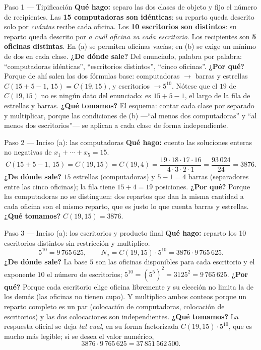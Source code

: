 \documentclass[11pt]{article}
\begin{document}
\begin{paso}{Paso 1 --- Tipificación}
\textbf{Qué hago:} separo las dos clases de objeto y fijo el número de recipientes.
Las \textbf{15 computadoras son idénticas}: su reparto queda descrito solo por \emph{cuántas} recibe cada oficina. Los \textbf{10 escritorios son distintos}: su reparto queda descrito por \emph{a cuál oficina va cada escritorio}. Los recipientes son \textbf{5 oficinas distintas}. En (a) se permiten oficinas vacías; en (b) se exige un mínimo de dos en cada clase.
\textbf{¿De dónde sale?} Del enunciado, palabra por palabra: ``computadoras idénticas'', ``escritorios distintos'', ``cinco oficinas''.
\textbf{¿Por qué?} Porque de ahí salen las dos fórmulas base: computadoras $\to$ barras y estrellas $C(15+5-1,\,15)=C(19,15)$, y escritorios $\to 5^{10}$. Nótese que el $19$ de $C(19,15)$ no es ningún dato del enunciado: es $15+5-1$, el largo de la fila de estrellas y barras.
\textbf{¿Qué tomamos?} El esquema: contar cada clase por separado y multiplicar, porque las condiciones de (b) —``al menos dos computadoras'' y ``al menos dos escritorios''— se aplican a cada clase de forma independiente.
\end{paso}

\begin{paso}{Paso 2 --- Inciso (a): las computadoras}
\textbf{Qué hago:} cuento las soluciones enteras no negativas de $x_1+\cdots+x_5=15$.
\[
C(15+5-1,\,15)=C(19,15)=C(19,4)=\frac{19\cdot18\cdot17\cdot16}{4\cdot3\cdot2\cdot1}=\frac{93\,024}{24}=3876 .
\]
\textbf{¿De dónde sale?} $15$ estrellas (computadoras) y $5-1=4$ barras (separadores entre las cinco oficinas); la fila tiene $15+4=19$ posiciones.
\textbf{¿Por qué?} Porque las computadoras no se distinguen: dos repartos que dan la misma cantidad a cada oficina son el mismo reparto, que es justo lo que cuenta barras y estrellas.
\textbf{¿Qué tomamos?} $C(19,15)=3876$.
\end{paso}

\begin{paso}{Paso 3 --- Inciso (a): los escritorios y producto final}
\textbf{Qué hago:} reparto los 10 escritorios distintos sin restricción y multiplico.
\[
5^{10}=9\,765\,625,\qquad N_a=C(19,15)\cdot 5^{10}=3876\cdot 9\,765\,625 .
\]
\textbf{¿De dónde sale?} La base $5$ son las oficinas disponibles para cada escritorio y el exponente $10$ el número de escritorios; $5^{10}=(5^5)^2=3125^2=9\,765\,625$.
\textbf{¿Por qué?} Porque cada escritorio elige oficina libremente y su elección no limita la de los demás (las oficinas no tienen cupo). Y multiplico ambos conteos porque un reparto completo es un par (colocación de computadoras, colocación de escritorios) y las dos colocaciones son independientes.
\textbf{¿Qué tomamos?} La respuesta oficial se deja \emph{tal cual}, en su forma factorizada $C(19,15)\cdot 5^{10}$, que es mucho más legible; si se desea el valor numérico,
\[
3876\cdot 9\,765\,625=37\,851\,562\,500 .
\]
\end{paso}
\end{document}
